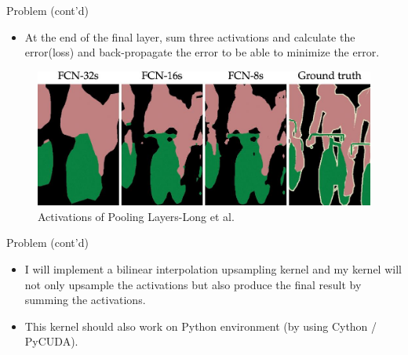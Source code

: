\documentclass{beamer}
\begin{document}
	\begin{frame}{Problem (cont'd)}
		\begin{itemize}
			\item \justifying At the end of the final layer, sum three activations and calculate the error(loss) and back-propagate the error to be able to minimize the error.
		\end{itemize}
		\begin{figure}
			\includegraphics[scale=0.15]{./Figures/fcn_output.jpg}
			\caption{\label{fig:fcn_output}Activations of Pooling Layers-Long et al.\cite{long2015fully}}
		\end{figure}
	\end{frame}
	\begin{frame}{Problem (cont'd)}
		\begin{itemize}
			\item\justifying I will implement a bilinear interpolation upsampling kernel and my kernel will not only upsample the activations but also produce the final result by summing the activations.
			\item\justifying This kernel should also work on Python environment (by using Cython / PyCUDA).
		\end{itemize}
	\end{frame}
	
\end{document}
